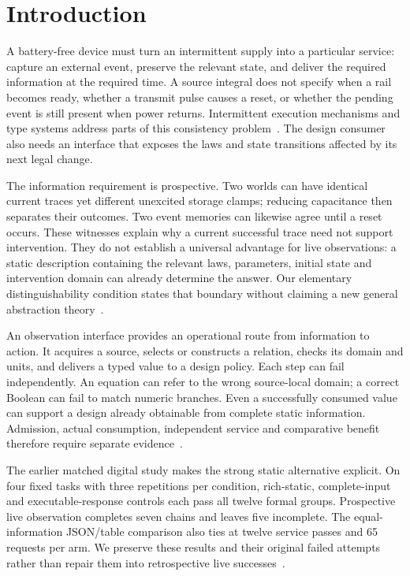 \section{Introduction}
A battery-free device must turn an intermittent supply into a particular
service: capture an external event, preserve the relevant state, and deliver
the required information at the required time. A source integral does not
specify when a rail becomes ready, whether a transmit pulse causes a reset,
or whether the pending event is still present when power returns. Intermittent
execution mechanisms and type systems address parts of this consistency
problem~\cite{alpaca,curricle}. The design consumer also needs an interface
that exposes the laws and state transitions affected by its next legal change.

The information requirement is prospective. Two worlds can have identical
current traces yet different unexcited storage clamps; reducing capacitance
then separates their outcomes. Two event memories can likewise agree until a
reset occurs. These witnesses explain why a current successful trace need not
support intervention. They do not establish a universal advantage for live
observations: a static description containing the relevant laws, parameters,
initial state and intervention domain can already determine the answer.
Our elementary distinguishability condition states that boundary without
claiming a new general abstraction theory~\cite{cegar,structural,mechanisms}.

An observation interface provides an operational route from information to
action. It acquires a source, selects or constructs a relation, checks its
domain and units, and delivers a typed value to a design policy. Each step can
fail independently. An equation can refer to the wrong source-local domain;
a correct Boolean can fail to match numeric branches. Even a successfully
consumed value can support a design already obtainable from complete static
information. Admission, actual consumption, independent service and comparative
benefit therefore require separate evidence~\cite{contract,original,tables}.

The earlier matched digital study makes the strong static alternative
explicit. On four fixed tasks with three repetitions per condition,
rich-static, complete-input and executable-response controls each pass all
twelve formal groups. Prospective live observation completes seven chains and
leaves five incomplete. The equal-information JSON/table comparison also ties
at twelve service passes and 65 requests per arm. We preserve these results
and their original failed attempts rather than repair them into retrospective
live successes~\cite{comparison,tables,gateways}.

